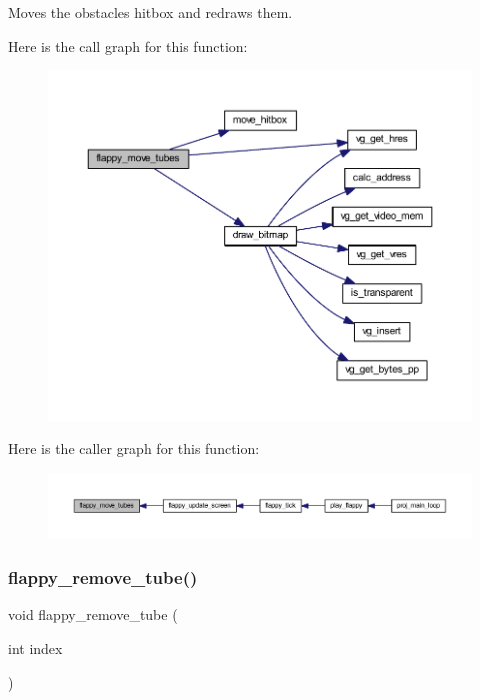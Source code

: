 Moves the obstacles hitbox and redraws them. 

Here is the call graph for this function\+:\nopagebreak
\begin{figure}[H]
\begin{center}
\leavevmode
\includegraphics[width=350pt]{group__flappy_gaa9297621f8ee414c88d82528044d564e_cgraph}
\end{center}
\end{figure}
Here is the caller graph for this function\+:\nopagebreak
\begin{figure}[H]
\begin{center}
\leavevmode
\includegraphics[width=350pt]{group__flappy_gaa9297621f8ee414c88d82528044d564e_icgraph}
\end{center}
\end{figure}
\mbox{\label{group__flappy_ga674a35d4936f4ab784c85addd4b4b830}} 
\subsubsection{\texorpdfstring{flappy\+\_\+remove\+\_\+tube()}{flappy\_remove\_tube()}}
{\footnotesize\ttfamily void flappy\+\_\+remove\+\_\+tube (\begin{DoxyParamCaption}\item[{int}]{index }\end{DoxyParamCaption})}



